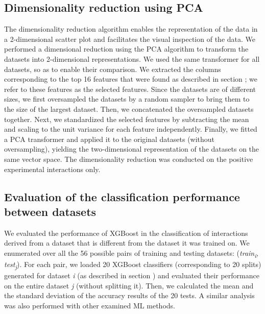 \documentclass{bmcart}
\begin{document}
\subsection*{Dimensionality reduction using PCA}
The dimensionality reduction algorithm enables the representation of the data in a 2-dimensional scatter plot and facilitates the visual inspection of the data. We performed a dimensional reduction using the PCA algorithm to transform the datasets into 2-dimensional representations. 
We used the same transformer for all datasets, so as to enable their comparison. 
We extracted the columns corresponding to the top 16 features that were found as described in section ; we refer to these features as the selected features. Since the datasets are of different sizes, we first oversampled the datasets by a random sampler to bring them to the size of the largest dataset. Then, we concatenated the oversampled datasets together. Next, we standardized the selected features by subtracting the mean and scaling to the unit variance for each feature independently. Finally, we fitted a PCA transformer and applied it to the original datasets (without oversampling), yielding the two-dimensional representation of the datasets on the same vector space. The dimensionality reduction was conducted on the positive experimental interactions only.

\subsection*{Evaluation of the classification performance between datasets}
We evaluated the performance of XGBoost in the classification of interactions derived from a dataset that is different from the dataset it was trained on. We enumerated over all the 56 possible pairs of training and testing datasets: (\textit{train\textsubscript{i}, test\textsubscript{j}}). For each pair, we loaded 20 XGBoost classifiers (corresponding to 20 splits) generated for dataset \textit{i} (as described in section ) and evaluated their performance on the entire dataset \textit{j} (without splitting it). Then, we calculated the mean and the standard deviation of the accuracy results of the 20 tests. A similar analysis was also performed with other examined ML methods.




\end{document}
